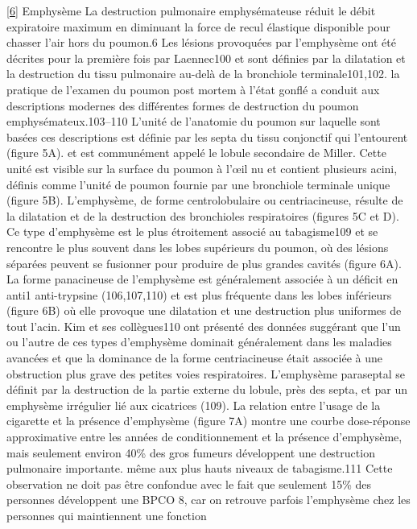 \documentclass[12pt,]{article}
\begin{document}
{[}\protect\hyperlink{ref-hogg2004pathophysiology}{6}{]} Emphysème La
destruction pulmonaire emphysémateuse réduit le débit expiratoire
maximum en diminuant la force de recul élastique disponible pour chasser
l'air hors du poumon.6 Les lésions provoquées par l'emphysème ont été
décrites pour la première fois par Laennec100 et sont définies par la
dilatation et la destruction du tissu pulmonaire au-delà de la
bronchiole terminale101,102. la pratique de l'examen du poumon post
mortem à l'état gonflé a conduit aux descriptions modernes des
différentes formes de destruction du poumon emphysémateux.103--110
L'unité de l'anatomie du poumon sur laquelle sont basées ces
descriptions est définie par les septa du tissu conjonctif qui
l'entourent (figure 5A). et est communément appelé le lobule secondaire
de Miller. Cette unité est visible sur la surface du poumon à l'œil nu
et contient plusieurs acini, définis comme l'unité de poumon fournie par
une bronchiole terminale unique (figure 5B). L'emphysème, de forme
centrolobulaire ou centriacineuse, résulte de la dilatation et de la
destruction des bronchioles respiratoires (figures 5C et D). Ce type
d'emphysème est le plus étroitement associé au tabagisme109 et se
rencontre le plus souvent dans les lobes supérieurs du poumon, où des
lésions séparées peuvent se fusionner pour produire de plus grandes
cavités (figure 6A). La forme panacineuse de l'emphysème est
généralement associée à un déficit en anti1 anti-trypsine (106,107,110)
et est plus fréquente dans les lobes inférieurs (figure 6B) où elle
provoque une dilatation et une destruction plus uniformes de tout
l'acin. Kim et ses collègues110 ont présenté des données suggérant que
l'un ou l'autre de ces types d'emphysème dominait généralement dans les
maladies avancées et que la dominance de la forme centriacineuse était
associée à une obstruction plus grave des petites voies respiratoires.
L'emphysème paraseptal se définit par la destruction de la partie
externe du lobule, près des septa, et par un emphysème irrégulier lié
aux cicatrices (109). La relation entre l'usage de la cigarette et la
présence d'emphysème (figure 7A) montre une courbe dose-réponse
approximative entre les années de conditionnement et la présence
d'emphysème, mais seulement environ 40\% des gros fumeurs développent
une destruction pulmonaire importante. même aux plus hauts niveaux de
tabagisme.111 Cette observation ne doit pas être confondue avec le fait
que seulement 15\% des personnes développent une BPCO 8, car on retrouve
parfois l'emphysème chez les personnes qui maintiennent une fonction
\end{document}
